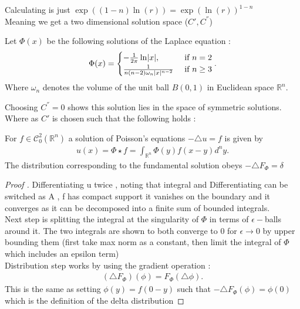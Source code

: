 Calculating is just $\exp((1-n)\ln(r) ) = \exp(\ln(r))^{1-n} $ \\ [1ex]
Meaning we get a two dimensional solution space ($C',C^{''} $)
\begin{definition}
  Let $\Phi(x)$ be the following solutions of the Laplace equation  : 
  \begin{align*}
    \Phi(x) = \begin{cases}
      -\frac{1 }{2\pi }\ln \lvert x \rvert, &\text{ if }n=2\\
      \frac{1}{n(n-2)\omega_n \lvert x \rvert^{n-2 } } &\text{ if } n\ge 3
    \end{cases}
  .\end{align*}
  Where $\omega_n$ denotes the volume of the unit ball $B(0,1)$ in Euclidean space $\mathbb{R}^{n} $.
\end{definition}
Choosing $C^{''} =0$ shows this solution lies in the space of symmetric solutions.\\
Where as $C'$ is chosen such that the following holds : 
\begin{theorem} 
  For $f \in  \mathcal{C}^{2}_0(\mathbb{R}^{n} ) $ a solution of Poisson's equations $- \triangle u = f$ is given by 
  \begin{align*}
    u(x) = \Phi \star f  = \int_{\mathbb{R}^{n } } \Phi(y)f(x-y) d^{n }y 
  .\end{align*}
  The distribution corresponding to the fundamental solution obeys $- \triangle F_{\Phi } = \delta $
\end{theorem}
\begin{proof}[Proof ]
  Differentiating u twice , noting that integral and Differentiating can be switched as A , f has compact support 
  it vanishes on the boundary and it converges as it can be decomposed into a finite sum of bounded integrals.\\[1ex]
  Next step is splitting the integral at the singularity of $\Phi $ in terms of $\epsilon -$balls around it.
  The two integrals are shown to both converge to 0 for $\epsilon  \to  0$ by upper bounding them (first take max norm as a constant, then limit the integral of $\Phi $ which includes an epsilon term)\\[1ex]
  Distribution step works by using the gradient operation : 
  \begin{align*}
    (\triangle F_{\Phi })(\phi ) = F_{\Phi }(\triangle \phi ) 
  .\end{align*}
  This is the same as setting $\phi(y) = f(0-y)$ such that $-\triangle F_{\Phi }(\phi ) = \phi(0)$ which is the definition of the delta distribution
\end{proof}
\begin{comment}
  In general, a fundamental solution of a constant coefficient linear PDE $Lu = f$ has the property that 
  $L \Phi  = \delta $ in the sense of distribution. : 
  \begin{align*}
    L(\Phi \star  f)  = (L \Phi) \star  f = \delta \star  f = f
  .\end{align*}
\end{comment}
